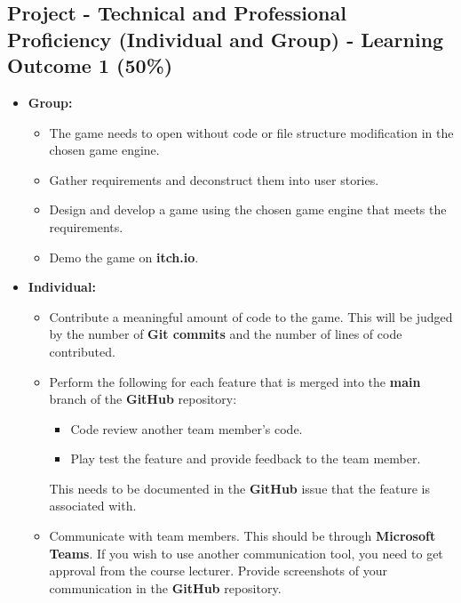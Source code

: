 \documentclass{article}
\begin{document}
\subsection*{Project - Technical and Professional Proficiency (Individual and Group) - Learning Outcome 1 (50\%)}
\begin{itemize}
	 \item \textbf{Group:}
	\begin{itemize}
		\item The game needs to open without code or file structure modification in the chosen game engine.
		\item Gather requirements and deconstruct them into user stories.
		\item Design and develop a game using the chosen game engine that meets the requirements. 
		\item Demo the game on \textbf{itch.io}.
	\end{itemize}
	\item \textbf{Individual:}
	\begin{itemize}
		\item Contribute a meaningful amount of code to the game. This will be judged by the number of \textbf{Git commits} and the number of lines of code contributed.
		\item Perform the following for each feature that is merged into the \textbf{main} branch of the \textbf{GitHub} repository:
		\begin{itemize}
			\item Code review another team member's code.
			\item Play test the feature and provide feedback to the team member.
		\end{itemize}
		This needs to be documented in the \textbf{GitHub} issue that the feature is associated with.
		\item Communicate with team members. This should be through \textbf{Microsoft Teams}. If you wish to use another communication tool, you need to get approval from the course lecturer. Provide screenshots of your communication in the \textbf{GitHub} repository.
	\end{itemize}
\end{itemize}
\end{document}
